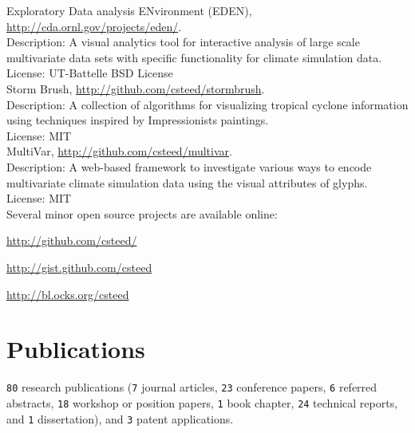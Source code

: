 \documentclass[11pt, a4paper]{article}
\newcommand{\amper}{{\fontspec[Scale=.95]{Hoefler Text}\selectfont\itshape\&}}
\newcommand{\years}[1]{\marginnote{\scriptsize #1}}
\newenvironment{packed_itemize}{
\begin{itemize}
  \setlength{\itemsep}{1pt}
  \setlength{\parskip}{0pt}
  \setlength{\parsep}{0pt}
}{\end{itemize}}
\begin{document}
\years{2012-2016}Exploratory Data analysis ENvironment (EDEN),
\href{http://cda.ornl.gov/projects/eden/}{http://cda.ornl.gov/projects/eden/}.\\
Description: A visual analytics tool for interactive analysis of large scale multivariate
data sets with specific functionality for climate simulation data.\\
License: UT-Battelle BSD License\\
\years{2015}Storm Brush,
\href{http://github.com/csteed/stormbrush}{http://github.com/csteed/stormbrush}.\\
Description: A collection of algorithms for visualizing tropical cyclone
information using techniques inspired by Impressionists paintings.\\
License: MIT\\
\years{2014}MultiVar,
\href{http://github.com/csteed/multivar}{http://github.com/csteed/multivar}.\\
Description: A web-based framework to investigate various ways to encode
multivariate climate simulation data using the visual attributes of glyphs.\\
License: MIT\\

Several minor open source projects are available online:
\begin{packed_itemize}
\item \href{http://github.com/csteed/}{http://github.com/csteed/}
\item \href{http://gist.github.com/csteed}{http://gist.github.com/csteed}
\item \href{http://bl.ocks.org/csteed}{http://bl.ocks.org/csteed}
\end{packed_itemize}

\section*{Publications}
\texttt{80} research publications
(\texttt{7} journal articles,
\texttt{23} conference papers, \texttt{6} referred abstracts,
\texttt{18} workshop or position papers, \texttt{1} book
chapter, \texttt{24} technical reports, and \texttt{1} dissertation),
and \texttt{3} patent applications.\\
\end{document}

